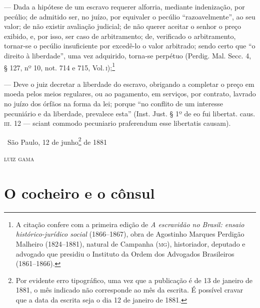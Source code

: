 --- Dada a hipótese de um escravo requerer alforria, mediante
indenização, por pecúlio; de admitido ser, no juízo, por equivaler o
pecúlio ``razoavelmente'', ao seu valor; de não existir avaliação
judicial; de não querer aceitar o senhor o preço exibido, e, por isso,
ser caso de arbitramento; de, verificado o arbitramento, tornar-se o
pecúlio insuficiente por excedê-lo o valor arbitrado; sendo certo que ``o
direito à liberdade'', uma vez adquirido, torna-se perpétuo (Perdig. Mal.
Secc. 4, § 127, nº 10, not. 714 e 715, Vol.\,\textsc{i});\footnote{A citação
  confere com a primeira edição de \emph{A escravidão no Brasil: ensaio
  histórico-jurídico social} (1866--1867), obra de Agostinho Marques
  Perdigão Malheiro (1824--1881), natural de Campanha (\textsc{mg}), historiador,
  deputado e advogado que presidiu o Instituto da Ordem dos Advogados
  Brasileiros (1861--1866).}

--- Deve o juiz decretar a liberdade do escravo, obrigando a completar
o preço em moeda pelos meios regulares, ou ao pagamento, em serviços,
por contrato, lavrado no juízo dos órfãos na forma da lei; porque ``no
conflito de um interesse pecuniário e da liberdade, prevalece esta''
(Inst. Just. § 1º de eo fui libertat. caus. \textsc{iii}. 12 --- sciant commodo
pecuniario praferendum esse libertatis causam). %

\medskip

\hfill\ São Paulo, 12 de junho\footnote{Por evidente erro tipográfico, uma
    vez que a publicação é de 13 de janeiro de 1881, o mês indicado não corresponde
    ao mês da escrita. É possível cravar que a data da escrita seja o
    dia 12 de janeiro de 1881.} de 1881

\hfill\textsc{luiz gama}

\part{O cocheiro e o cônsul}

